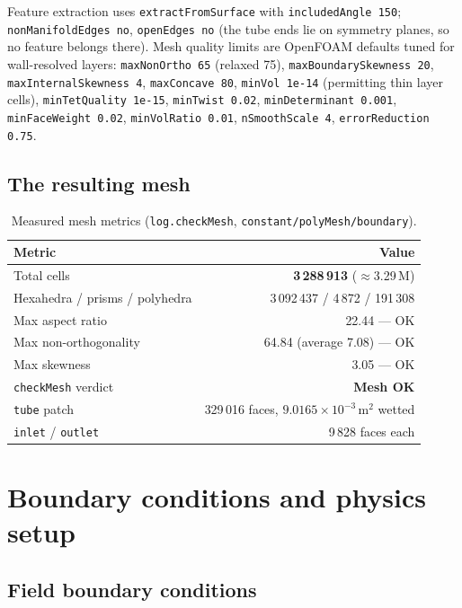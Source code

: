 \documentclass[11pt]{article}
\newcommand{\file}[1]{\texttt{\small #1}}
\begin{document}
Feature extraction uses \file{extractFromSurface} with \file{includedAngle 150}; \file{nonManifoldEdges no},
\file{openEdges no} (the tube ends lie on symmetry planes, so no feature belongs there). Mesh quality limits
are OpenFOAM defaults tuned for wall-resolved layers: \file{maxNonOrtho 65} (relaxed 75),
\file{maxBoundarySkewness 20}, \file{maxInternalSkewness 4}, \file{maxConcave 80}, \file{minVol 1e-14}
(permitting thin layer cells), \file{minTetQuality 1e-15}, \file{minTwist 0.02}, \file{minDeterminant 0.001},
\file{minFaceWeight 0.02}, \file{minVolRatio 0.01}, \file{nSmoothScale 4}, \file{errorReduction 0.75}.

\subsection{The resulting mesh}

\begin{table}[h]\centering\small
\caption{Measured mesh metrics (\file{log.checkMesh}, \file{constant/polyMesh/boundary}).}\label{tab:mesh}
\begin{tabular}{@{}lr@{}}
\toprule
Metric & Value\\
\midrule
Total cells & \textbf{3\,288\,913} ($\approx$3.29\,M)\\
Hexahedra / prisms / polyhedra & 3\,092\,437 / 4\,872 / 191\,308\\
Max aspect ratio & 22.44 --- OK\\
Max non-orthogonality & 64.84 (average 7.08) --- OK\\
Max skewness & 3.05 --- OK\\
\file{checkMesh} verdict & \textbf{Mesh OK}\\
\file{tube} patch & 329\,016 faces, $9.0165\times10^{-3}$\,m$^2$ wetted\\
\file{inlet} / \file{outlet} & 9\,828 faces each\\
\bottomrule
\end{tabular}
\end{table}


\section{Boundary conditions and physics setup}

\subsection{Field boundary conditions}
\end{document}
